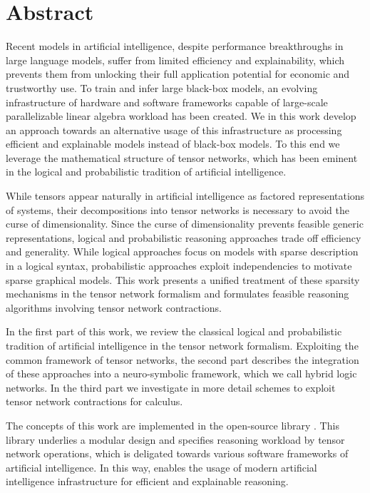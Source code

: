 \chapter{Abstract}

Recent models in artificial intelligence, despite performance breakthroughs in large language models, suffer from limited efficiency and explainability, which prevents them from unlocking their full application potential for economic and trustworthy use.
To train and infer large black-box models, an evolving infrastructure of hardware and software frameworks capable of large-scale parallelizable linear algebra workload has been created.
We in this work develop an approach towards an alternative usage of this infrastructure as processing efficient and explainable models instead of black-box models.
To this end we leverage the mathematical structure of tensor networks, which has been eminent in the logical and probabilistic tradition of artificial intelligence.

While tensors appear naturally in artificial intelligence as factored representations of systems, their decompositions into tensor networks is necessary to avoid the curse of dimensionality. %
Since the curse of dimensionality prevents feasible generic representations, logical and probabilistic reasoning approaches trade off efficiency and generality.
While logical approaches focus on models with sparse description in a logical syntax, probabilistic approaches exploit independencies to motivate sparse graphical models.
This work presents a unified treatment of these sparsity mechanisms in the tensor network formalism and formulates feasible reasoning algorithms involving tensor network contractions.

In the first part of this work, we review the classical logical and probabilistic tradition of artificial intelligence in the tensor network formalism.
Exploiting the common framework of tensor networks, the second part describes the integration of these approaches into a neuro-symbolic framework, which we call hybrid logic networks.
In the third part we investigate in more detail schemes to exploit tensor network contractions for calculus.

The concepts of this work are implemented in the open-source \python library \tnreason.
This library underlies a modular design and specifies reasoning workload by tensor network operations, which is deligated towards various software frameworks of artificial intelligence.
In this way, \tnreason enables the usage of modern artificial intelligence infrastructure for efficient and explainable reasoning.